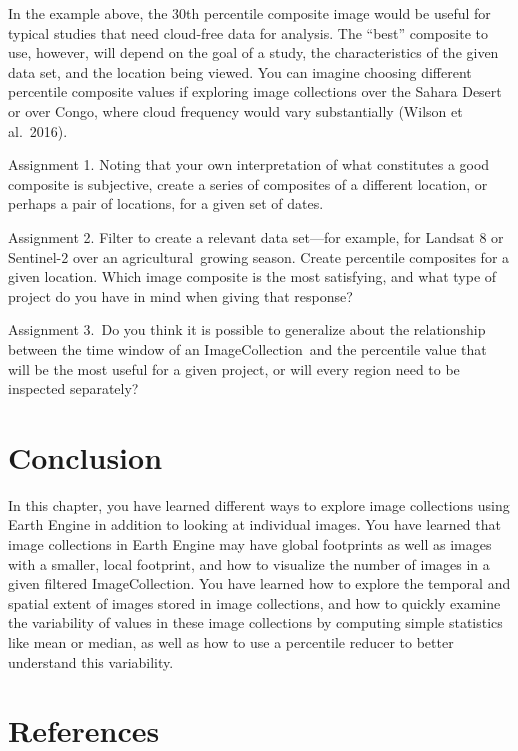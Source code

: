 \documentclass[
  letterpaper,
  DIV=11,
  numbers=noendperiod]{scrreprt}
\begin{document}

In the example above, the 30th percentile composite image would be
useful for typical studies that need cloud-free data for analysis. The
``best'' composite to use, however, will depend on the goal of a study,
the characteristics of the given data set, and the location being
viewed. You can imagine choosing different percentile composite values
if exploring image collections over the Sahara Desert or over Congo,
where cloud frequency would vary substantially (Wilson et al.~2016).

Assignment 1. Noting that your own interpretation of what constitutes a
good composite is subjective, create a series of composites of a
different location, or perhaps a pair of locations, for a given set of
dates.

Assignment 2. Filter to create a relevant data set---for example, for
Landsat 8 or Sentinel-2 over an agricultural~growing season. Create
percentile composites for a given location. Which image composite is the
most satisfying, and what type of project do you have in mind when
giving that response?

Assignment 3.~Do you think it is possible to generalize about the
relationship between the time window of an ImageCollection~and the
percentile value that will be the most useful for a given project, or
will every region need to be inspected separately?

\hypertarget{conclusion-8}{%
\section*{Conclusion}\label{conclusion-8}}


In this chapter, you have learned different ways to explore image
collections using Earth Engine in addition to looking at individual
images. You have learned that image collections in Earth Engine may have
global footprints as well as images with a smaller, local footprint, and
how to visualize the number of images in a given filtered
ImageCollection. You have learned how to explore the temporal and
spatial extent of images stored in image collections, and how to quickly
examine the variability of values in these image collections by
computing simple statistics like mean or median, as well as how to use a
percentile reducer to better understand this variability.

\hypertarget{references-4}{%
\section*{References}\label{references-4}}
\end{document}
